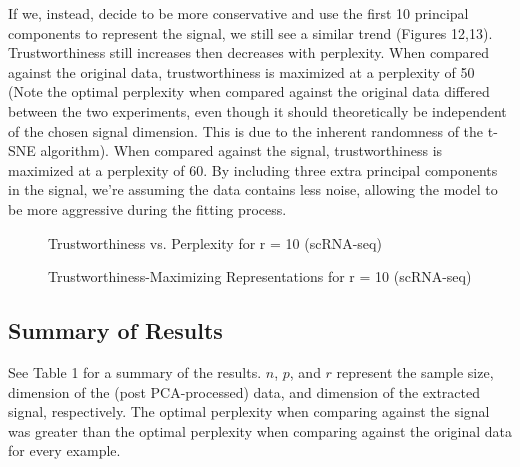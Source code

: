 \documentclass{article}
\begin{document}
If we, instead, decide to be more conservative and use the first 10 principal components to represent the signal, we still see a similar trend (Figures 12,13). Trustworthiness still increases then decreases with perplexity. When compared against the original data, trustworthiness is maximized at a perplexity of 50 (Note the optimal perplexity when compared against the original data differed between the two experiments, even though it should theoretically be independent of the chosen signal dimension. This is due to the inherent randomness of the t-SNE algorithm). When compared against the signal, trustworthiness is maximized at a perplexity of 60. By including three extra principal components in the signal, we're assuming the data contains less noise, allowing the model to be more aggressive during the fitting process.

\renewcommand{\thefigure}{12}
\begin{figure}[H]
\centering
\caption{Trustworthiness vs. Perplexity for r = 10 (scRNA-seq)}
\end{figure}

\renewcommand{\thefigure}{13}
\begin{figure}[H]
\centering
\caption{Trustworthiness-Maximizing Representations for r = 10 (scRNA-seq)}
\end{figure}

\subsection{Summary of Results}
See Table 1 for a summary of the results. $n$, $p$, and $r$ represent the sample size, dimension of the (post PCA-processed) data, and dimension of the extracted signal, respectively. The optimal perplexity when comparing against the signal was greater than the optimal perplexity when comparing against the original data for every example.
\end{document}
